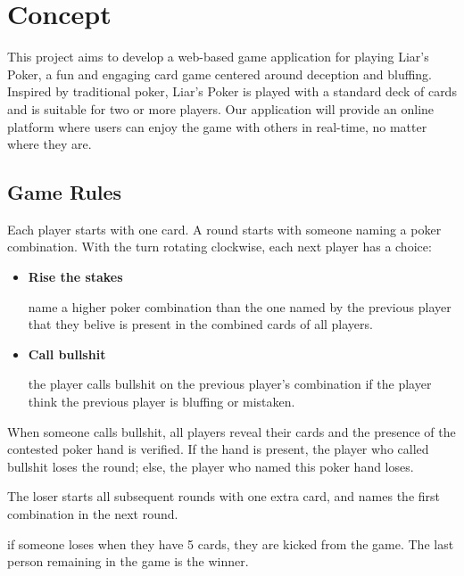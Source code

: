 \documentclass{scrartcl}
\begin{document}


\section{Concept}\label{concept}
This project aims to develop a web-based game application for playing Liar's Poker, a fun and engaging card game centered around deception and bluffing. Inspired by traditional poker, Liar's Poker is played with a standard deck of cards and is suitable for two or more players. Our application will provide an online platform where users can enjoy the game with others in real-time, no matter where they are.

\subsection{Game Rules}\label{game-rules}
Each player starts with one card. A round starts with someone naming a poker combination. With the turn rotating clockwise, each next player has a choice:
\begin{itemize}
  \item \textbf{Rise the stakes}\par
  name a higher poker combination than the one named by the previous player that they belive is present in the combined cards of all players.
  \item \textbf{Call bullshit} \par
  the player calls bullshit on the previous player's combination if the player think the previous player is bluffing or mistaken.
\end{itemize}
When someone calls bullshit, all players reveal their cards and the presence of the contested poker hand is verified. If the hand is present, the player who called bullshit loses the round; else, the player who named this poker hand loses.\par\noindent
The loser starts all subsequent rounds with one extra card, and names the first combination in the next round.\par\noindent
if someone loses when they have 5 cards, they are kicked from the game.
The last person remaining in the game is the winner.
\end{document}
